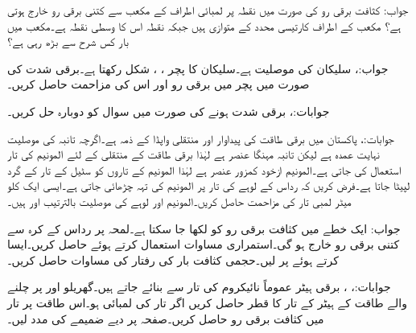 جواب:
کثافت برقی رو  کی صورت میں نقطہ  پر  لمبائی اطراف کے مکعب سے کتنی برقی رو خارج ہوتی ہے؟ مکعب کے اطراف کارتیسی محدد کے متوازی ہیں جبکہ نقطہ  اس کا وسطی نقطہ ہے۔مکعب میں بار کس شرح سے بڑھ رہی ہے؟

جواب:، 
سلیکان کی موصلیت  ہے۔سلیکان کا پچر ، ،  شکل رکھتا ہے۔برقی شدت   کی صورت میں پچر میں برقی رو اور اس کی مزاحمت حاصل کریں۔

جوابات:، 
برقی شدت  ہونے کی صورت میں سوال  کو دوبارہ حل کریں۔

جوابات:، 
پاکستان میں برقی طاقت کی پیداوار اور منتقلی واپڈا کے ذمہ ہے۔اگرچہ تانبہ کی موصلیت نہایت عمدہ ہے لیکن تانبہ مہنگا عنصر ہے لہٰذا برقی طاقت کے منتقلی کے لئے المونیم کی تار استعمال کی جاتی ہے۔المونیم ازخود کمزور عنصر ہے لہٰذا المونیم کے تاروں کو سٹیل کے تار کے گرد لپیٹا جاتا ہے۔فرض کریں کہ   رداس کے لوہے کی تار پر  المونیم کی تہہ چڑھائی جاتی ہے۔ایسی ایک کلو میٹر لمبی تار کی مزاحمت حاصل کریں۔المونیم اور لوہے کی موصلیت بالترتیب  اور  ہیں۔
   
جواب:
ایک خطے میں کثافت برقی رو کو  لکھا جا سکتا ہے۔لمحہ  پر رداس  کے کرہ سے کتنی برقی رو خارج ہو گی۔استمراری مساوات  استعمال کرتے ہوئے   حاصل کریں۔ایسا کرتے ہوئے  پر  لیں۔حجمی کثافت بار  کی رفتار کی مساوات حاصل کریں۔

جوابات:، ، 
برقی ہیٹر عموماً نائیکروم کی تار سے بنائے جاتے ہیں۔گھریلو  اور  پر چلنے والے  طاقت کے ہیٹر کے تار کا قطر حاصل کریں اگر تار کی لمبائی  ہو۔اس طاقت پر تار میں کثافت برقی رو حاصل کریں۔صفحہ  پر دیے ضمیمے کی مدد لیں۔   

